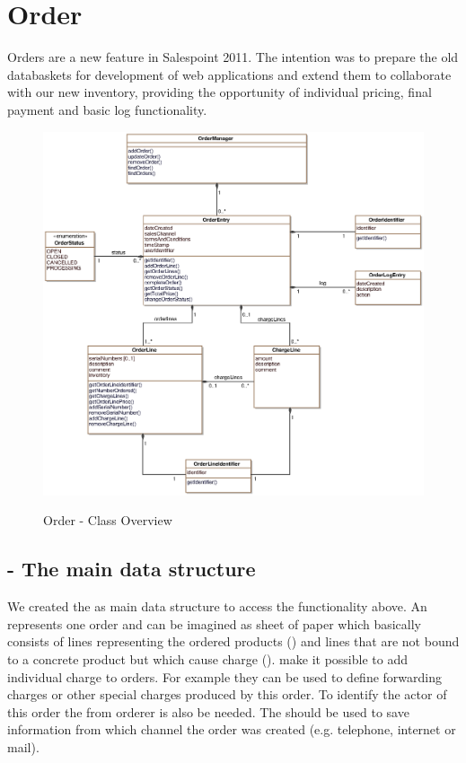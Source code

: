 \newpage
\section{Order}
Orders are a new feature in Salespoint 2011. The intention was to prepare the old databaskets for development of web applications and extend them to collaborate with our new inventory, providing the opportunity of individual pricing, final payment and basic log functionality.

\begin{figure}[ht]
	\centering
  \includegraphics[scale =.7]{images/Overview_Order.eps}
	\label{order_overview}
	\caption{Order - Class Overview}
\end{figure}

\subsection{ - The main data structure}
We created the  as main data structure to access the functionality above. An  represents one order and can be imagined as sheet of paper which basically consists of lines representing the ordered products () and lines that are not bound to a concrete product but which cause charge ().  make it possible to add individual charge to orders. For example they can be used to define forwarding charges or other special charges produced by this order. To identify the actor of this order the  from orderer is also be needed. The  should be used to save information from which channel the order was created (e.g. telephone, internet or mail).

